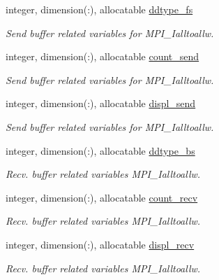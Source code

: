 \begin{DoxyCompactItemize}
\item 
integer, dimension(\+:), allocatable \mbox{\hyperlink{structmodule__stdma_1_1stdma__plan__many_a0d3ca6c89a9c1d47cc2e0df0a3160c08}{ddtype\+\_\+fs}}
\begin{DoxyCompactList}\small\item\em Send buffer related variables for M\+P\+I\+\_\+\+Ialltoallw. \end{DoxyCompactList}\item 
integer, dimension(\+:), allocatable \mbox{\hyperlink{structmodule__stdma_1_1stdma__plan__many_a4bf445309fd4740827a188160354536a}{count\+\_\+send}}
\begin{DoxyCompactList}\small\item\em Send buffer related variables for M\+P\+I\+\_\+\+Ialltoallw. \end{DoxyCompactList}\item 
integer, dimension(\+:), allocatable \mbox{\hyperlink{structmodule__stdma_1_1stdma__plan__many_a78987f3bd9e87b612fa3d4a2ac85aa0a}{displ\+\_\+send}}
\begin{DoxyCompactList}\small\item\em Send buffer related variables for M\+P\+I\+\_\+\+Ialltoallw. \end{DoxyCompactList}\end{DoxyCompactItemize}

\textbf{ }\par
\begin{DoxyCompactItemize}
\item 
integer, dimension(\+:), allocatable \mbox{\hyperlink{structmodule__stdma_1_1stdma__plan__many_a264b748ea3feb795c3531d3d1f004bc8}{ddtype\+\_\+bs}}
\begin{DoxyCompactList}\small\item\em Recv. buffer related variables M\+P\+I\+\_\+\+Ialltoallw. \end{DoxyCompactList}\item 
integer, dimension(\+:), allocatable \mbox{\hyperlink{structmodule__stdma_1_1stdma__plan__many_a572723c149990425e6109dc8614bacb4}{count\+\_\+recv}}
\begin{DoxyCompactList}\small\item\em Recv. buffer related variables M\+P\+I\+\_\+\+Ialltoallw. \end{DoxyCompactList}\item 
integer, dimension(\+:), allocatable \mbox{\hyperlink{structmodule__stdma_1_1stdma__plan__many_ae60c70d406ef511431a335c9eb2f029c}{displ\+\_\+recv}}
\begin{DoxyCompactList}\small\item\em Recv. buffer related variables M\+P\+I\+\_\+\+Ialltoallw. \end{DoxyCompactList}\end{DoxyCompactItemize}

